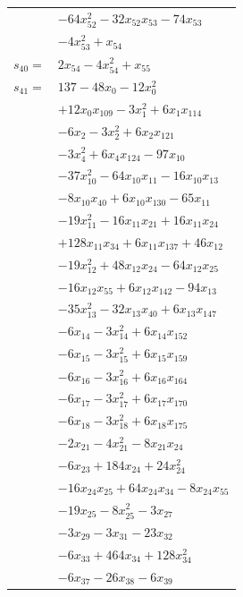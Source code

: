 \begin{longtable}{@{}r@{\;}l@{}}
 & \(\displaystyle -64x_{52}^{2} -32x_{52}x_{53} -74x_{53}\) \\
 & \(\displaystyle -4x_{53}^{2} +x_{54}\) \\[3pt]
\(s_{40}=\) & \(\displaystyle 2x_{54} -4x_{54}^{2} +x_{55}\) \\[3pt]
\(s_{41}=\) & \(\displaystyle 137 -48x_{0} -12x_{0}^{2}\) \\
 & \(\displaystyle +12x_{0}x_{109} -3x_{1}^{2} +6x_{1}x_{114}\) \\
 & \(\displaystyle -6x_{2} -3x_{2}^{2} +6x_{2}x_{121}\) \\
 & \(\displaystyle -3x_{4}^{2} +6x_{4}x_{124} -97x_{10}\) \\
 & \(\displaystyle -37x_{10}^{2} -64x_{10}x_{11} -16x_{10}x_{13}\) \\
 & \(\displaystyle -8x_{10}x_{40} +6x_{10}x_{130} -65x_{11}\) \\
 & \(\displaystyle -19x_{11}^{2} -16x_{11}x_{21} +16x_{11}x_{24}\) \\
 & \(\displaystyle +128x_{11}x_{34} +6x_{11}x_{137} +46x_{12}\) \\
 & \(\displaystyle -19x_{12}^{2} +48x_{12}x_{24} -64x_{12}x_{25}\) \\
 & \(\displaystyle -16x_{12}x_{55} +6x_{12}x_{142} -94x_{13}\) \\
 & \(\displaystyle -35x_{13}^{2} -32x_{13}x_{40} +6x_{13}x_{147}\) \\
 & \(\displaystyle -6x_{14} -3x_{14}^{2} +6x_{14}x_{152}\) \\
 & \(\displaystyle -6x_{15} -3x_{15}^{2} +6x_{15}x_{159}\) \\
 & \(\displaystyle -6x_{16} -3x_{16}^{2} +6x_{16}x_{164}\) \\
 & \(\displaystyle -6x_{17} -3x_{17}^{2} +6x_{17}x_{170}\) \\
 & \(\displaystyle -6x_{18} -3x_{18}^{2} +6x_{18}x_{175}\) \\
 & \(\displaystyle -2x_{21} -4x_{21}^{2} -8x_{21}x_{24}\) \\
 & \(\displaystyle -6x_{23} +184x_{24} +24x_{24}^{2}\) \\
 & \(\displaystyle -16x_{24}x_{25} +64x_{24}x_{34} -8x_{24}x_{55}\) \\
 & \(\displaystyle -19x_{25} -8x_{25}^{2} -3x_{27}\) \\
 & \(\displaystyle -3x_{29} -3x_{31} -23x_{32}\) \\
 & \(\displaystyle -6x_{33} +464x_{34} +128x_{34}^{2}\) \\
 & \(\displaystyle -6x_{37} -26x_{38} -6x_{39}\) \\

\end{longtable}
